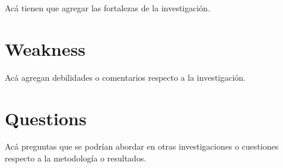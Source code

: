 \documentclass{article}
\begin{document}
Acá tienen que agregar las fortalezas de la investigación.

\section{Weakness}\label{Debilidades}

Acá agregan debilidades o comentarios respecto a la investigación.

\section*{Questions}

Acá preguntas que se podrían abordar en otras investigaciones o cuestiones respecto a la metodología o resultados.



\end{document}
